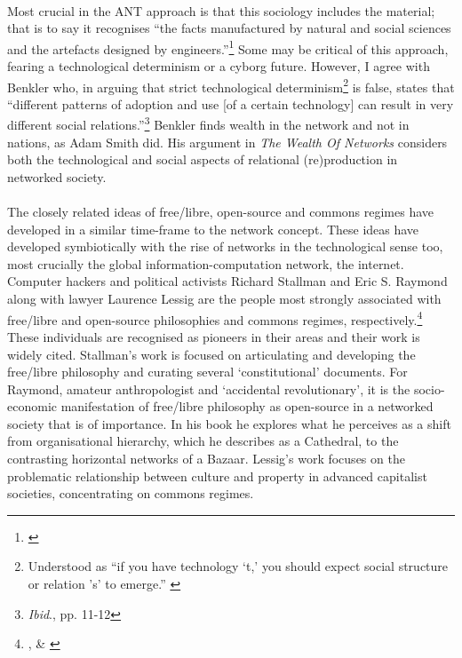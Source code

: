 \documentclass[11pt,titlepage]{book}
\begin{document}
\paragraph{}Most crucial in the ANT approach is that this sociology includes the material; that is to say it recognises ``the facts manufactured by natural and social sciences and the artefacts designed by engineers.''\footnote{\cite{latour:1998ant1}} Some may be critical of this approach, fearing a technological determinism or a cyborg future. However, I agree with Benkler who, in arguing that strict technological determinism\footnote{Understood as ``if you have technology `t,' you should expect social structure or relation 's' to emerge.'' \cite[pp. 11-12]{benkler:2006wn}} is false, states that ``different patterns of adoption and use [of a certain technology] can result in very different social relations.''\footnote{\textit{Ibid}., pp. 11-12} Benkler finds wealth in the network and not in nations, as Adam Smith did. His argument in \textit{The Wealth Of Networks} considers both the technological and social aspects of relational (re)production in networked society. 

\paragraph{}The closely related ideas of free/libre, open-source and commons regimes have developed in a similar time-frame to the network concept. These ideas have developed symbiotically with the rise of networks in the technological sense too, most crucially the global information-computation network, the internet. Computer hackers and political activists Richard Stallman and Eric S. Raymond along with lawyer Laurence Lessig are the people most strongly associated with free/libre and open-source philosophies and commons regimes, respectively.\footnote{\cite{Stallman:2002xy}, \cite{raymond:1999catb} \& \cite{Lessig:2004pi}} These individuals are recognised as pioneers in their areas and their work is widely cited. Stallman's work is focused on articulating and developing the free/libre philosophy and curating several `constitutional' documents. For Raymond, amateur anthropologist and `accidental revolutionary', it is the socio-economic manifestation of free/libre philosophy as open-source in a networked society that is of importance. In his book he explores what he perceives as a shift from organisational hierarchy, which he describes as a Cathedral, to the contrasting horizontal networks of a Bazaar. Lessig's work focuses on the problematic relationship between culture and property in advanced capitalist societies, concentrating on commons regimes.
\end{document}
